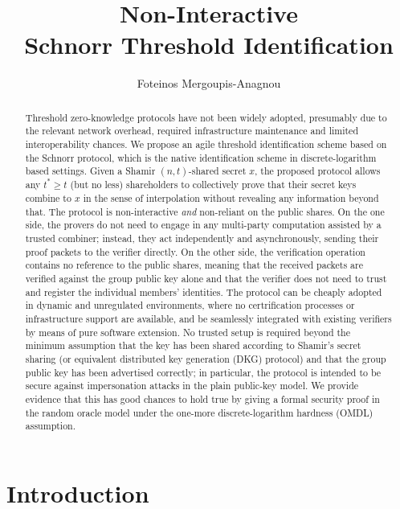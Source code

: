 \documentclass[10pt, psamsfonts, reqno]{amsart}
\title{Non-Interactive \\Schnorr Threshold Identification}
\author{Foteinos Mergoupis-Anagnou}
\theoremstyle{definition}
\theoremstyle{remark}
\numberwithin{equation}{section}
\begin{document}
\begin{abstract}
Threshold zero-knowledge protocols
have not been widely adopted,
presumably due to the relevant network overhead,
required infrastructure maintenance
and limited interoperability chances.
We propose an agile
threshold identification scheme based
on the Schnorr protocol,
which is the native identification scheme
in discrete-logarithm based settings.
Given a Shamir $(n, t)$-shared secret $x$, the proposed protocol allows
any $t^* \ge t$ (but no less) shareholders to collectively prove
that their secret keys combine to $x$ in the sense of interpolation
without revealing any information beyond that.
The protocol is non-interactive \textit{and} non-reliant
on the public shares.
On the one side, the provers do not need to engage
in any multi-party computation assisted by a trusted combiner;
instead, they act independently and asynchronously,
sending their proof packets to the verifier directly.
On the other side, the verification operation
contains no reference to the public shares,
meaning that the received packets are verified against
the group public key alone and that the verifier does not need to
trust and register the individual members' identities.
The protocol can be cheaply adopted in
dynamic and unregulated environments,
where no certrification processes or infrastructure support
are available, and be seamlessly integrated
with existing verifiers by means of pure software extension.
No trusted setup is required beyond
the minimum assumption that the key has been
shared according to Shamir's secret sharing (or
equivalent distributed key generation (DKG) protocol)
and that the group public key has been advertised correctly;
in particular, the protocol is intended to be
secure against impersonation attacks
in the plain public-key model.
We provide evidence that this has good chances to
hold true by giving a formal security proof
in the random oracle model under the
one-more discrete-logarithm hardness (OMDL) assumption.

\end{abstract}

\maketitle


\section{Introduction}
\end{document}
